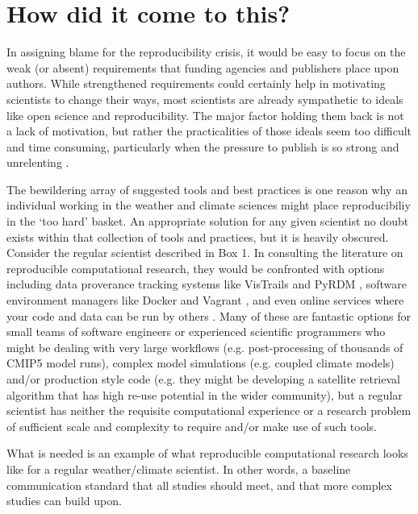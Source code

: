 \section{How did it come to this?}

In assigning blame for the reproducibility crisis, it would be easy to focus on the weak (or absent) requirements that funding agencies and publishers place upon authors. While strengthened requirements could certainly help in motivating scientists to change their ways, most scientists are already sympathetic to ideals like open science and reproducibility. The major factor holding them back is not a lack of motivation, but rather the practicalities of those ideals seem too difficult and time consuming, particularly when the pressure to publish is so strong and unrelenting \citep[e.g.][]{Stodden2010}. 

The bewildering array of suggested tools and best practices is one reason why an individual working in the weather and climate sciences might place reproducibiliy in the `too hard' basket. An appropriate solution for any given scientist no doubt exists within that collection of tools and practices, but it is heavily obscured. Consider the regular scientist described in Box 1. In consulting the literature on reproducible computational research, they would be confronted with options including data proverance tracking systems like VisTrails \citep{Freire2012} and PyRDM \citep{Jacobs2014}, software environment managers like Docker and Vagrant \citep{Stodden2014}, and even online services where your code and data can be run by others \citep{Stodden2012}. Many of these are fantastic options for small teams of software engineers or experienced scientific programmers who might be dealing with very large workflows (e.g. post-processing of thousands of CMIP5 model runs), complex model simulations (e.g. coupled climate models) and/or production style code (e.g. they might be developing a satellite retrieval algorithm that has high re-use potential in the wider community), but a regular scientist has neither the requisite computational experience or a research problem of sufficient scale and complexity to require and/or make use of such tools.

What is needed is an example of what reproducible computational research looks like for a regular weather/climate scientist. In other words, a baseline communication standard that all studies should meet, and that more complex studies can build upon.